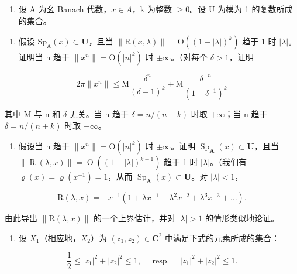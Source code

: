 \begin{enumerate}
\def\labelenumi{\arabic{enumi})}
\setcounter{enumi}{15}
\tightlist
\item
  设 A 为幺 Banach 代数，\(x \in A\)，k 为整数 \(\geqslant 0\)。设 U 为模为 1 的复数所成的集合。
\end{enumerate}

\begin{enumerate}
\def\labelenumi{\alph{enumi})}
\tightlist
\item
  假设 \(\mathrm{Sp}_{\mathrm{A}}(x)\subset\mathbf{U}\)，且当 \(\|\mathrm{R}(x,\lambda)\|=\mathrm{O}((1-|\lambda|)^{k})\) 趋于 1 时 \(|\lambda|\)。证明当 n 趋于 \(\|x^{n}\|=\mathrm{O}(|n|^{k})\) 时 \(\pm\infty\)。（对每个 \(\delta>1\)，证明
\end{enumerate}

\[
2 \pi \| x ^ {n} \| \leqslant \mathrm{M} \frac {\delta^ {n}}{(\delta - 1) ^ {k}} + \mathrm{M} \frac {\delta^ {- n}}{(1 - \delta^ {- 1}) ^ {k}}
\]

其中 M 与 n 和 \(\delta\) 无关。当 n 趋于 \(\delta = n/(n - k)\) 时取 \(+\infty\)；当 n 趋于 \(\delta = n/(n + k)\) 时取 \(-\infty\)。

\begin{enumerate}
\def\labelenumi{\alph{enumi})}
\setcounter{enumi}{1}
\tightlist
\item
  假设当 n 趋于 \(\|x^{n}\|=\mathrm{O}(|n|^{k})\) 时 \(\pm\infty\)。证明 \(\operatorname{Sp}_{\mathbf{A}}(x)\subset\mathbf{U}\)，且当 \(\|\operatorname{R}(\lambda,x)\|=\operatorname{O}((1-|\lambda|)^{k+1})\) 趋于 1 时 \(|\lambda|\)。（我们有 \(\varrho(x)=\varrho(x^{-1})=1\)，从而 \(\operatorname{Sp}_{\mathbf{A}}(x)\subset\mathbf{U}\)。对 \(|\lambda|<1\)，
\end{enumerate}

\[
\mathrm{R} (\lambda , x) = - x ^ {- 1} \left(1 + \lambda x ^ {- 1} + \lambda^ {2} x ^ {- 2} + \lambda^ {3} x ^ {- 3} + \dots\right).
\]

由此导出 \(\|\mathrm{R}(\lambda,x)\|\) 的一个上界估计，并对 \(|\lambda|>1\) 的情形类似地论证。

\begin{enumerate}
\def\labelenumi{\arabic{enumi})}
\setcounter{enumi}{16}
\tightlist
\item
  设 \(X_{1}\)（相应地，\(X_{2}\)）为 \((z_{1}, z_{2}) \in \mathbf{C}^{2}\) 中满足下式的元素所成的集合：
\end{enumerate}

\[
\frac {1}{2} \leqslant | z _ {1} | ^ {2} + | z _ {2} | ^ {2} \leqslant 1, \quad \text { resp. } \quad | z _ {1} | ^ {2} + | z _ {2} | ^ {2} \leqslant 1.
\]

